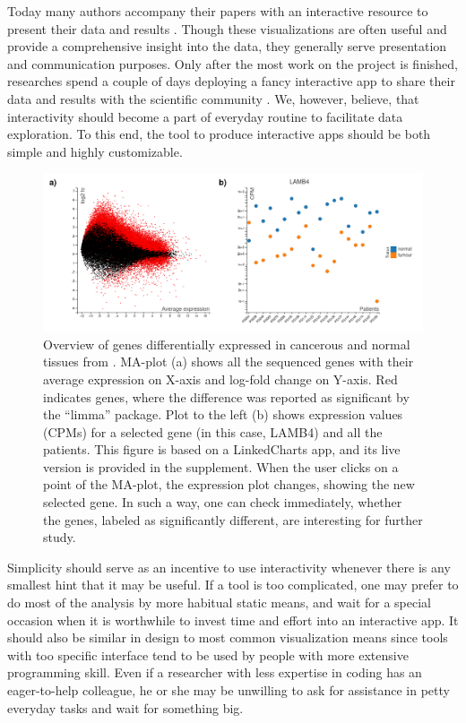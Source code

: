 \documentclass[twocolumn,10pt]{article}
\begin{document}
Today many authors accompany their papers with an interactive resource to present their data and results \citep{travaglini_2020, roider_2020, kalucka_2020}. Though these visualizations are often useful and provide a comprehensive insight into the data, they generally serve presentation and communication purposes. Only after the most work on the project is finished, researches spend a couple of days deploying a fancy interactive app to share their data and results with the scientific community \citep{batch_2017}. We, however, believe, that interactivity should become a part of everyday routine to facilitate data exploration. To this end, the tool to produce interactive apps should be both simple and highly customizable.

\begin{figure}[b]
	\includegraphics[width=\textwidth]{FigD/figD.png}
	\caption{Overview of genes differentially expressed in cancerous and normal tissues from \citet{conway_2015}. MA-plot (a) shows all the sequenced genes with their average expression on X-axis and log-fold change on Y-axis. Red indicates genes, where the difference was reported as significant by the ``limma''  \citep{ritchie_2015}  package. Plot to the left (b) shows expression values (CPMs) for a selected gene (in this case, LAMB4) and all the patients. This figure is based on a LinkedCharts app, and its live version is provided in the supplement. When the user clicks on a point of the MA-plot, the expression plot changes, showing the new selected gene. In such a way, one can check immediately, whether the genes, labeled as significantly different, are interesting for further study.}
	\label{FigD}
\end{figure}

Simplicity should serve as an incentive to use interactivity whenever there is any smallest hint that it may be useful. If a tool is too complicated, one may prefer to do most of the analysis by more habitual static means, and wait for a special occasion when it is worthwhile to invest time and effort into an interactive app. It should also be similar in design to most common visualization means since tools with too specific interface tend to be used by people with more extensive programming skill. Even if a researcher with less expertise in coding has an eager-to-help colleague, he or she may be unwilling to ask for assistance in petty everyday tasks and wait for something big.
\end{document}

